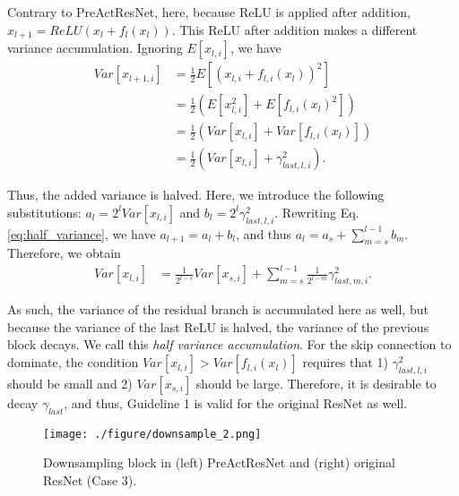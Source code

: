 \documentclass{article}
\begin{document}
Contrary to PreActResNet, here, because ReLU is applied after addition, $x_{l+1} = ReLU(x_l + f_l(x_l))$. This ReLU after addition makes a different variance accumulation. Ignoring $E[x_{l,i}]$, we have
\begin{align}
	Var[x_{l+1,i}] & = \frac{1}{2} E[(x_{l,i} + f_{l,i}(x_l))^2]                                  \\
	               & = \frac{1}{2} (E[x_{l,i}^2] + E[f_{l,i}(x_l)^2])                             \\
	               & = \frac{1}{2} (Var[x_{l,i}] + Var[f_{l,i}(x_l)])                             \\
	               & = \frac{1}{2} (Var[x_{l,i}] + \gamma_{last,l,i}^2). \label{eq:half_variance}
\end{align}

Thus, the added variance is halved. Here, we introduce the following substitutions: $a_l = 2^l Var[x_{l,i}]$ and $b_l = 2^l \gamma_{last,l,i}^2$. Rewriting Eq. \ref{eq:half_variance}, we have $a_{l+1} = a_l + b_l$, and thus $a_l = a_s + \sum_{m=s}^{l-1} b_m$. Therefore, we obtain
\begin{align}
    Var[x_{l,i}] & = \frac{1}{2^{l-s}} Var[x_{s,i}] + \sum_{m=s}^{l-1} \frac{1}{2^{l-m}} \gamma_{last,m,i}^2. \label{eq:half_variance_lth}
\end{align}

As such, the variance of the residual branch is accumulated here as well, but because the variance of the last ReLU is halved, the variance of the previous block decays. We call this \emph{half variance accumulation}. For the skip connection to dominate, the condition $Var[x_{l,i}] > Var[f_{l,i}(x_l)]$ requires that 1) $\gamma_{last,l,i}^2$ should be small and 2) $Var[x_{s,i}]$ should be large. Therefore, it is desirable to decay $\gamma_{last}$, and thus, Guideline 1 is valid for the original ResNet as well.

\begin{figure}[t!]
	\centering
    \texttt{[image: ./figure/downsample\_2.png]}
\caption{Downsampling block in (left) PreActResNet and (right) original ResNet (Case 3).}
	\label{fig:downsample}
\end{figure}
\end{document}
